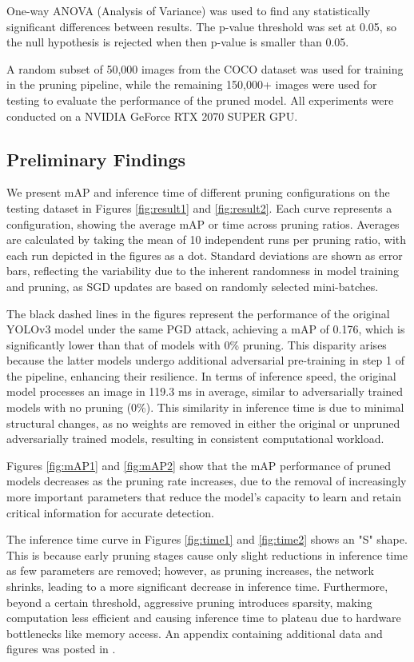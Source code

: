 \documentclass[10pt]{cai}
\begin{document}
One-way ANOVA (Analysis of Variance) was used to find any statistically significant differences between results. The p-value threshold was set at 0.05, so the null hypothesis is rejected when then p-value is smaller than 0.05. 

A random subset of 50,000 images from the COCO dataset was used for training in the pruning pipeline, while the remaining 150,000+ images were used for testing to evaluate the performance of the pruned model. All experiments were conducted on a NVIDIA GeForce RTX 2070 SUPER GPU.


\subsection{Preliminary Findings}
We present mAP and inference time of different pruning configurations on the testing dataset in Figures \ref{fig:result1} and \ref{fig:result2}. Each curve represents a configuration, showing the average mAP or time across pruning ratios. Averages are calculated by taking the mean of 10 independent runs per pruning ratio, with each run depicted in the figures as a dot. Standard deviations are shown as error bars, reflecting the variability due to the inherent randomness in model training and pruning, as SGD updates are based on randomly selected mini-batches.

The black dashed lines in the figures represent the performance of the original YOLOv3 model under the same PGD attack, achieving a mAP of 0.176, which is significantly lower than that of models with 0\% pruning. This disparity arises because the latter models undergo additional adversarial pre-training in step 1 of the pipeline, enhancing their resilience. In terms of inference speed, the original model processes an image in 119.3 ms in average, similar to adversarially trained models with no pruning (0\%). This similarity in inference time is due to minimal structural changes, as no weights are removed in either the original or unpruned adversarially trained models, resulting in consistent computational workload.

Figures \ref{fig:mAP1} and \ref{fig:mAP2} show that the mAP performance of pruned models decreases as the pruning rate increases, due to the removal of increasingly more important parameters that reduce the model's capacity to learn and retain critical information for accurate detection. 

The inference time curve in Figures \ref{fig:time1} and \ref{fig:time2} shows an "S" shape. This is because early pruning stages cause only slight reductions in inference time as few parameters are removed; however, as pruning increases, the network shrinks, leading to a more significant decrease in inference time. Furthermore, beyond a certain threshold, aggressive pruning introduces sparsity, making computation less efficient and causing inference time to plateau due to hardware bottlenecks like memory access. An appendix containing additional data and figures was posted in  \cite{MyAppendix}.
\end{document}
